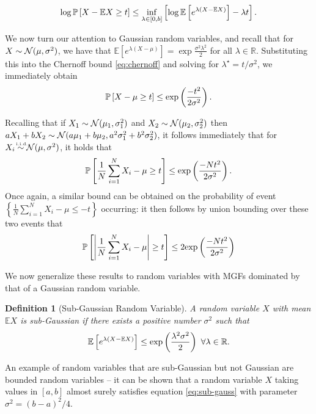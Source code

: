 \documentclass{article}[12pt]
\newtheorem{defn}{Definition}
\def\R{\mathbf{R}}
\def\E{\mathbb{E}}
\def \E{\mathbb E}
\def \R{\mathbb R}
\begin{document}
\begin{equation}
 \log\Prob{X - \E X \geq t} \leq \inf_{\lambda \in [0,b]}\left[\log\E\left[e^{\lambda(X-\E X)}\right] - \lambda t \right].
\label{eq:chernoff}
 \end{equation}
 
 We now turn our attention to Gaussian random variables, and recall that for $X \sim \mathcal{N} (\mu,\sigma^2)$, we have that $\E\left[e^{\lambda(X-\mu)}\right]= \exp{\frac{\sigma^2 \lambda^2}{2}}$ for all $\lambda \in \R$.  Substituting this into the Chernoff bound \eqref{eq:chernoff} and solving for $\lambda^\star = t/\sigma^2$, we immediately obtain
\begin{equation}
\mathbb{P}\left[X-\mu \geq t\right] \leq \mathrm{exp}\left(\frac{-t^2}{2\sigma^2}\right).
\label{eq:gauss-conc}
\end{equation}
 
 
 Recalling that if $X_1 \sim \mathcal{N}(\mu_1, \sigma_1^2)$ and $X_2 \sim \mathcal{N}(\mu_2,\sigma_2^2)$ then $aX_1+bX_2 \sim \mathcal{N}(a\mu_1 + b\mu_2, a^2\sigma_1^2 + b^2 \sigma_2^2)$, it follows immediately that for $X_i \iid \Normal(\mu,\sigma^2)$, it holds that
\begin{equation}
\mathbb{P}\left[\frac{1}{N}\sum_{i=1}^N X_i - \mu \geq t\right] \leq \mathrm{exp}\left(\frac{-Nt^2}{2\sigma^2}\right).
\label{eq:gauss-mean-prob}
\end{equation}
Once again, a similar bound can be obtained on the probability of event $\left\{\frac{1}{N}\sum_{i=1}^N X_i - \mu \leq -t \right\}$ occurring: it then follows by union bounding over these two events that 
\begin{equation}
\mathbb{P}\left[\left|\frac{1}{N}\sum_{i=1}^N X_i - \mu \right|\geq t\right] \leq 2\mathrm{exp}\left(\frac{-Nt^2}{2\sigma^2}\right)
\label{eq:gauss-mean-deviation}
\end{equation}

We now generalize these results to random variables with MGFs dominated by that of a Gaussian random variable.
 
 \begin{defn}[Sub-Gaussian Random Variable]
A random variable $X$ with mean $\E X$ is sub-Gaussian if there exists a positive number $\sigma^2$ such that
\begin{equation}
\mgf \leq \exp{\frac{\lambda^2\sigma^2}{2}} \ \forall \lambda \in \R.
\label{eq:sub-gauss}
\end{equation}
\label{def:sub-gauss}
\end{defn}
 
 
 An example of random variables that are sub-Gaussian but not Gaussian are bounded random variables -- it can be shown that a random variable $X$ taking values in $[a,b]$ almost surely satisfies equation \eqref{eq:sub-gauss} with parameter $\sigma^2 = (b-a)^2/4$.
\end{document}

